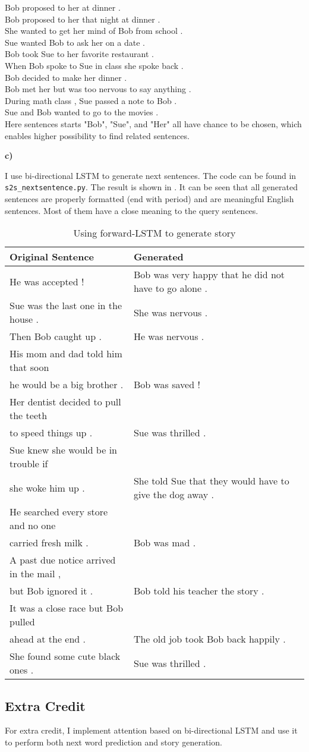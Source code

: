 \documentclass{article}
\begin{document}
Bob proposed to her at dinner . \\
Bob proposed to her that night at dinner . \\
She wanted to get her mind of Bob from school . \\
Sue wanted Bob to ask her on a date . \\
Bob took Sue to her favorite restaurant . \\
When Bob spoke to Sue in class she spoke back . \\
Bob decided to make her dinner . \\
Bob met her but was too nervous to say anything . \\
During math class , Sue passed a note to Bob . \\
Sue and Bob wanted to go to the movies . \\

Here sentences starts "Bob", "Sue", and "Her" all have chance to be chosen, which enables higher possibility to find related sentences.

\textbf{c)}

I use bi-directional LSTM to generate next sentences. The code can be found in \texttt{s2s\_nextsentence.py}. The result is shown in . It can be seen that all generated sentences are properly formatted (end with period) and are meaningful English sentences. Most of them have a close meaning to the query sentences.
\begin{table}
\begin{tabular}{l|l}
\textbf{Original Sentence} & \textbf{Generated} \\
\hline
He was accepted ! &  Bob was very happy that he did not have to go alone . \\
\hline
Sue was the last one in the house . & She was nervous . \\
\hline
Then Bob caught up . & He was nervous . \\
\hline
His mom and dad told him that soon\\ he would be a big brother . & Bob was saved ! \\
\hline
Her dentist decided to pull the teeth \\to speed things up . &Sue was thrilled . \\
\hline
Sue knew she would be in trouble if \\ she woke him up .  & She told Sue that they would have to give the dog away . \\
\hline
He searched every store and no one \\carried fresh milk . & Bob was mad .\\
\hline
A past due notice arrived in the mail , \\but Bob ignored it . & Bob told his teacher the story . \\
\hline
It was a close race but Bob pulled \\ahead at the end . &The old job took Bob back happily . \\
\hline
She found some cute black ones . & Sue was thrilled . \\
\end{tabular}
\caption{Using forward-LSTM to generate story}
\label{tab:gen}
\end{table}
\subsection{Extra Credit}
For extra credit, I implement attention based on bi-directional LSTM and use it to perform both next word prediction and story generation. 
\end{document}
